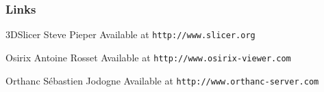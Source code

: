 \documentclass[11pt]{beamer}
\begin{document}
\begin{frame}
  \frametitle{Links}
    
  \begin{thebibliography}{10}
        
  \beamertemplatearticlebibitems
 
  	3DSlicer
    \newblock Steve Pieper
    \newblock Available at {\tt http://www.slicer.org}

   \beamertemplatearticlebibitems
 
  	Osirix
    \newblock Antoine Rosset
    \newblock Available at {\tt http://www.osirix-viewer.com}
    
      \beamertemplatearticlebibitems
 
  	Orthanc
    \newblock Sébastien Jodogne
    \newblock Available at {\tt http://www.orthanc-server.com}
 
  \end{thebibliography}
\end{frame}
\end{document}
